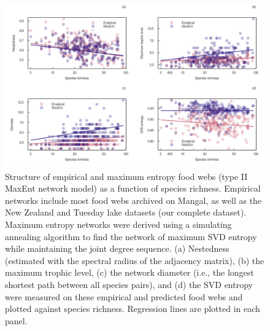 \documentclass[
  12pt,
]{article}
\begin{document}
\begin{figure}
\hypertarget{fig:measures_richness}{%
\centering
\includegraphics{figures/measures_richness.png}
\caption{Structure of empirical and maximum entropy food webs (type II
MaxEnt network model) as a function of species richness. Empirical
networks include most food webs archived on Mangal, as well as the New
Zealand and Tuesday lake datasets (our complete dataset). Maximum
entropy networks were derived using a simulating annealing algorithm to
find the network of maximum SVD entropy while maintaining the joint
degree sequence. (a) Nestedness (estimated with the spectral radius of
the adjacency matrix), (b) the maximum trophic level, (c) the network
diameter (i.e., the longest shortest path between all species pairs),
and (d) the SVD entropy were measured on these empirical and predicted
food webs and plotted against species richness. Regression lines are
plotted in each panel.}\label{fig:measures_richness}
}
\end{figure}
\end{document}
